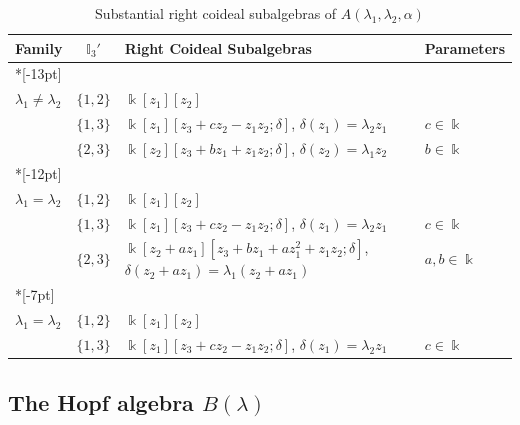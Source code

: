 \documentclass{article}
\theoremstyle{plain}
\theoremstyle{definition}
\renewcommand\arraystretch{2}
\numberwithin{equation}{section}
\newcommand{\II}{\mathbb{I}}
\begin{document}
	\begin{table}[H] 
		\centering
		\caption{Substantial right coideal subalgebras of $A(\lambda_{1},\lambda_{2},\alpha)$} 
		\label{table1}
		\renewcommand{\arraystretch}{1.5}
		\begin{tabular}{|>{\centering\arraybackslash}m{2.6cm}|c|>{\raggedright\arraybackslash}m{5.1cm}|>{\centering\arraybackslash}m{1.8cm}|}
			\hline
			Family & $\II_{3}'$ & Right Coideal Subalgebras & Parameters \\
			\hline
			\multirow{3}*[-13pt]{\shortstack{$A(\lambda_{1},\lambda_{2},0)$\\ $\lambda_{1}\neq\lambda_{2}$}}
			& $\{1,2\}$ & $\Bbbk[z_{1}][z_{2}]$ & \\
			\cline{2-4}
			& $\{1,3\}$ & $\Bbbk[z_{1}][z_{3}+c z_{2}-z_{1}z_{2}; \delta]$, \newline $\delta(z_{1})=\lambda_{2} z_{1}$ & $c\in\Bbbk$ \\
			\cline{2-4}
			& $\{2,3\}$ & $\Bbbk[z_{2}][z_{3}+b z_{1}+z_{1}z_{2}; \delta]$, \newline $\delta(z_{2})=\lambda_{1}z_{2}$ & $b\in\Bbbk$ \\
			\hline
			\multirow{3}*[-12pt]{\shortstack{$A(\lambda_{1},\lambda_{2},0)$\\ $\lambda_{1}=\lambda_{2}$}}
			& $\{1,2\}$ & $\Bbbk[z_{1}][z_{2}]$ & \\
			\cline{2-4}
			& $\{1,3\}$ & $\Bbbk[z_{1}][z_{3}+c z_{2}-z_{1}z_{2};\delta]$, \newline $\delta(z_{1})=\lambda_{2}z_{1}$ & $c\in\Bbbk$ \\
			\cline{2-4}
			& $\{2,3\}$ & $\Bbbk[z_{2}+az_{1}][z_{3}+bz_{1}+az_{1}^{2}+z_{1}z_{2};\delta]$, \newline $\delta(z_{2}+az_{1})=\lambda_{1}(z_{2}+az_{1})$ & $a,b\in \Bbbk$ \\
			\hline
			\multirow{2}*[-7pt]{\shortstack{$A(\lambda_{1},\lambda_{2},1)$\\ $\lambda_{1}=\lambda_{2}$}}
			& $\{1,2\}$ & $\Bbbk[z_{1}][z_{2}]$ & \\
			\cline{2-4}
			& $\{1,3\}$ & $\Bbbk[z_{1}][z_{3}+c z_{2}-z_{1}z_{2};\delta]$, \newline $\delta(z_{1})=\lambda_{2}z_{1}$ & $c\in\Bbbk$ \\
			\hline
		\end{tabular}
	\end{table}
	
	\subsection{The Hopf algebra $B(\lambda)$}
	\label{subsec:B-type}
	
\end{document}
